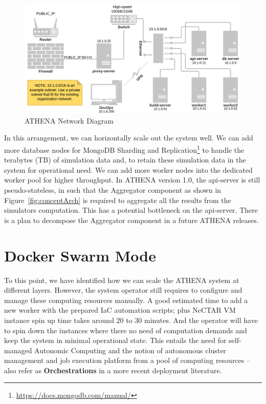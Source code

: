 \begin{figure}[H]
\centering
\includegraphics[width=0.7\paperwidth]{Figures/ATHENA_deploy_network_diagram}
\decoRule
\caption[ATHENA Network Diagram]{ATHENA Network Diagram}
\label{fig:deployNetwork}
\end{figure}

In this arrangement, we can horizontally scale out the system well. We can add more database nodes for MongoDB Sharding and Replication\footnote{\url{https://docs.mongodb.com/manual/}} to handle the terabytes (TB) of simulation data and, to retain these simulation data in the system for operational need. We can add more worker nodes into the dedicated worker pool for higher throughput. In ATHENA version 1.0, the api-server is still pseudo-stateless, in such that the Aggregator component as shown in Figure~\ref{fig:conceptArch} is required to aggregate all the results from the simulators computation. This has a potential bottleneck on the api-server. There is a plan to decompose the Aggregator component in a future ATHENA releases.

\section{Docker Swarm Mode}

To this point, we have identified how we can scale the ATHENA system at different layers. However, the system operator still requires to configure and manage these computing resources manually. A good estimated time to add a new worker with the prepared IaC automation scripts; plus NeCTAR VM instance spin up time takes around 20 to 30 minutes. And the operator will have to spin down the instances where there no need of computation demands and keep the system in minimal operational state. This entails the need for self-managed Autonomic Computing \parencite{1160055} and the notion of autonomous cluster management and job execution platform from a pool of computing resources -- also refer as \textbf{Orchestrations} in a more recent deployment literature.

